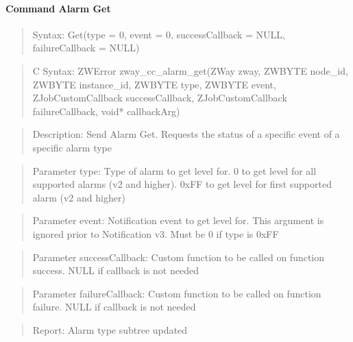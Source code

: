 \paragraph{Command Alarm Get}
\begin{quote}Syntax: Get(type = 0, event = 0, successCallback = NULL, failureCallback = NULL)\end{quote}
\begin{quote}C Syntax: ZWError zway\_cc\_alarm\_get(ZWay zway, ZWBYTE node\_id, ZWBYTE instance\_id, ZWBYTE type, ZWBYTE event, ZJobCustomCallback successCallback, ZJobCustomCallback failureCallback, void* callbackArg)\end{quote}
\begin{quote}Description: Send Alarm Get. Requests the status of a specific event of a specific alarm type\end{quote}
\begin{quote}Parameter type: Type of alarm to get level for. 0 to get level for all supported alarms (v2 and higher). 0xFF to get level for first supported alarm (v2 and higher)\end{quote}
\begin{quote}Parameter event: Notification event to get level for. This argument is ignored prior to Notification v3. Must be 0 if type is 0xFF\end{quote}
\begin{quote}Parameter successCallback: Custom function to be called on function success. NULL if callback is not needed\end{quote}
\begin{quote}Parameter failureCallback: Custom function to be called on function failure. NULL if callback is not needed\end{quote}
\begin{quote}Report: Alarm type subtree updated\end{quote}

